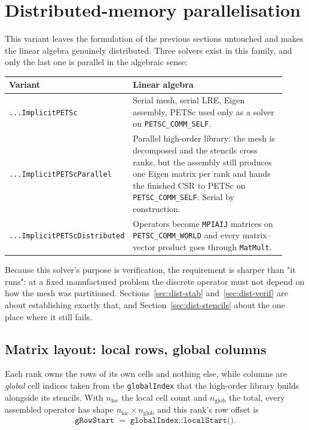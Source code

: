 \documentclass[11pt,a4paper]{article}
\newcommand{\code}[1]{\texttt{\small #1}}
\begin{document}
\section{Distributed-memory parallelisation}
\label{sec:distributed}

This variant leaves the formulation of the previous sections untouched and
makes the linear algebra genuinely distributed. Three solvers exist in this
family, and only the last one is parallel in the algebraic sense:

\begin{center}
\begin{tabular}{@{}p{0.30\linewidth}p{0.62\linewidth}@{}}
\toprule
Variant & Linear algebra \\
\midrule
\code{...ImplicitPETSc} & Serial mesh, serial LRE, Eigen assembly, PETSc used
   only as a solver on \code{PETSC\_COMM\_SELF}. \\
\code{...ImplicitPETScParallel} & Parallel high-order library: the mesh is
   decomposed and the stencils cross ranks, but the assembly still produces one
   Eigen matrix per rank and hands the finished CSR to PETSc on
   \code{PETSC\_COMM\_SELF}. Serial by construction. \\
\code{...ImplicitPETScDistributed} & Operators become \code{MPIAIJ} matrices on
   \code{PETSC\_COMM\_WORLD} and every matrix--vector product goes through
   \code{MatMult}. \\
\bottomrule
\end{tabular}
\end{center}

Because this solver's purpose is verification, the requirement is sharper than
"it runs": at a fixed manufactured problem the discrete operator must not
depend on how the mesh was partitioned. Sections~\ref{sec:dist-stab}
and~\ref{sec:dist-verif} are about establishing exactly that, and
Section~\ref{sec:dist-stencils} about the one place where it still fails.

\subsection{Matrix layout: local rows, global columns}
\label{sec:dist-layout}

Each rank owns the rows of its own cells and nothing else, while columns are
\emph{global} cell indices taken from the \code{globalIndex} that the
high-order library builds alongside its stencils. With $n_{\text{loc}}$ the
local cell count and $n_{\text{glob}}$ the total, every assembled operator has
shape $n_{\text{loc}}\times n_{\text{glob}}$ and this rank's row offset is
\[
   \texttt{gRowStart} \;=\; \texttt{globalIndex::localStart()} .
\]
\end{document}
